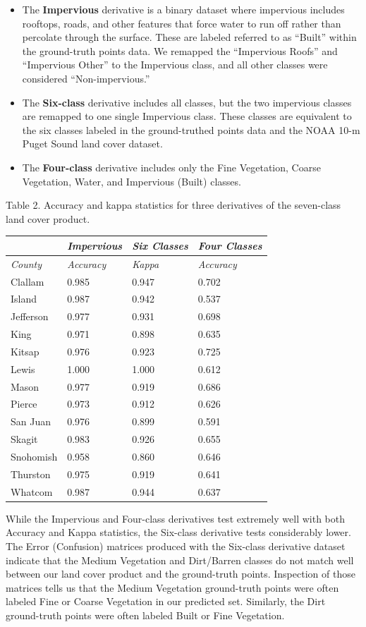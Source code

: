 \documentclass[
]{report}
\providecommand{\tightlist}{%
  \setlength{\itemsep}{0pt}\setlength{\parskip}{0pt}}
\begin{document}
\begin{itemize}
\tightlist
\item
  The \textbf{Impervious} derivative is a binary dataset where impervious includes rooftops, roads, and other features that force water to run off rather than percolate through the surface. These are labeled referred to as ``Built'' within the ground-truth points data. We remapped the ``Impervious Roofs'' and ``Impervious Other'' to the Impervious class, and all other classes were considered ``Non-impervious.''
\item
  The \textbf{Six-class} derivative includes all classes, but the two impervious classes are remapped to one single Impervious class. These classes are equivalent to the six classes labeled in the ground-truthed points data and the NOAA 10-m Puget Sound land cover dataset.
\item
  The \textbf{Four-class} derivative includes only the Fine Vegetation, Coarse Vegetation, Water, and Impervious (Built) classes.
\end{itemize}

Table 2. Accuracy and kappa statistics for three derivatives of the seven-class land cover product.

\begin{longtable}[]{@{}llll@{}}
\toprule
& \emph{Impervious} & \emph{Six Classes} & \emph{Four Classes}\tabularnewline
\midrule
\endhead
\emph{County} & \emph{Accuracy} & \emph{Kappa} & \emph{Accuracy}\tabularnewline
Clallam & 0.985 & 0.947 & 0.702\tabularnewline
Island & 0.987 & 0.942 & 0.537\tabularnewline
Jefferson & 0.977 & 0.931 & 0.698\tabularnewline
King & 0.971 & 0.898 & 0.635\tabularnewline
Kitsap & 0.976 & 0.923 & 0.725\tabularnewline
Lewis & 1.000 & 1.000 & 0.612\tabularnewline
Mason & 0.977 & 0.919 & 0.686\tabularnewline
Pierce & 0.973 & 0.912 & 0.626\tabularnewline
San Juan & 0.976 & 0.899 & 0.591\tabularnewline
Skagit & 0.983 & 0.926 & 0.655\tabularnewline
Snohomish & 0.958 & 0.860 & 0.646\tabularnewline
Thurston & 0.975 & 0.919 & 0.641\tabularnewline
Whatcom & 0.987 & 0.944 & 0.637\tabularnewline
\bottomrule
\end{longtable}

While the Impervious and Four-class derivatives test extremely well with both Accuracy and Kappa statistics, the Six-class derivative tests considerably lower. The Error (Confusion) matrices produced with the Six-class derivative dataset indicate that the Medium Vegetation and Dirt/Barren classes do not match well between our land cover product and the ground-truth points. Inspection of those matrices tells us that the Medium Vegetation ground-truth points were often labeled Fine or Coarse Vegetation in our predicted set. Similarly, the Dirt ground-truth points were often labeled Built or Fine Vegetation.
\end{document}
